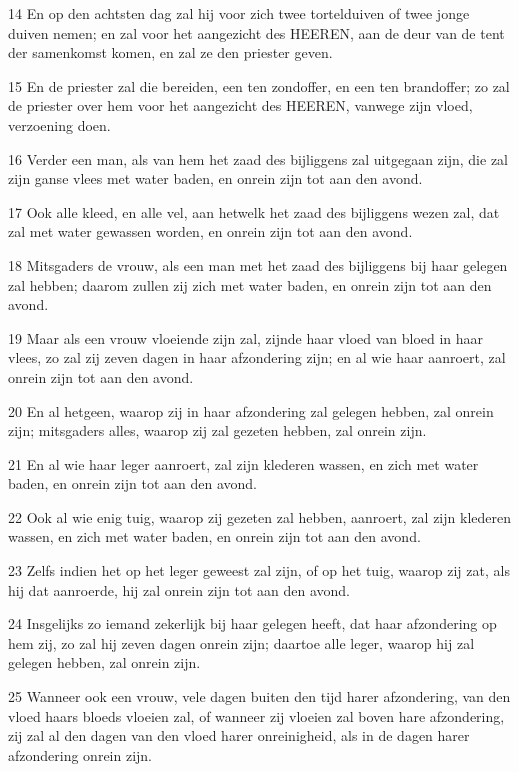 \par 14 En op den achtsten dag zal hij voor zich twee tortelduiven of twee jonge duiven nemen; en zal voor het aangezicht des HEEREN, aan de deur van de tent der samenkomst komen, en zal ze den priester geven.
\par 15 En de priester zal die bereiden, een ten zondoffer, en een ten brandoffer; zo zal de priester over hem voor het aangezicht des HEEREN, vanwege zijn vloed, verzoening doen.
\par 16 Verder een man, als van hem het zaad des bijliggens zal uitgegaan zijn, die zal zijn ganse vlees met water baden, en onrein zijn tot aan den avond.
\par 17 Ook alle kleed, en alle vel, aan hetwelk het zaad des bijliggens wezen zal, dat zal met water gewassen worden, en onrein zijn tot aan den avond.
\par 18 Mitsgaders de vrouw, als een man met het zaad des bijliggens bij haar gelegen zal hebben; daarom zullen zij zich met water baden, en onrein zijn tot aan den avond.
\par 19 Maar als een vrouw vloeiende zijn zal, zijnde haar vloed van bloed in haar vlees, zo zal zij zeven dagen in haar afzondering zijn; en al wie haar aanroert, zal onrein zijn tot aan den avond.
\par 20 En al hetgeen, waarop zij in haar afzondering zal gelegen hebben, zal onrein zijn; mitsgaders alles, waarop zij zal gezeten hebben, zal onrein zijn.
\par 21 En al wie haar leger aanroert, zal zijn klederen wassen, en zich met water baden, en onrein zijn tot aan den avond.
\par 22 Ook al wie enig tuig, waarop zij gezeten zal hebben, aanroert, zal zijn klederen wassen, en zich met water baden, en onrein zijn tot aan den avond.
\par 23 Zelfs indien het op het leger geweest zal zijn, of op het tuig, waarop zij zat, als hij dat aanroerde, hij zal onrein zijn tot aan den avond.
\par 24 Insgelijks zo iemand zekerlijk bij haar gelegen heeft, dat haar afzondering op hem zij, zo zal hij zeven dagen onrein zijn; daartoe alle leger, waarop hij zal gelegen hebben, zal onrein zijn.
\par 25 Wanneer ook een vrouw, vele dagen buiten den tijd harer afzondering, van den vloed haars bloeds vloeien zal, of wanneer zij vloeien zal boven hare afzondering, zij zal al den dagen van den vloed harer onreinigheid, als in de dagen harer afzondering onrein zijn.

